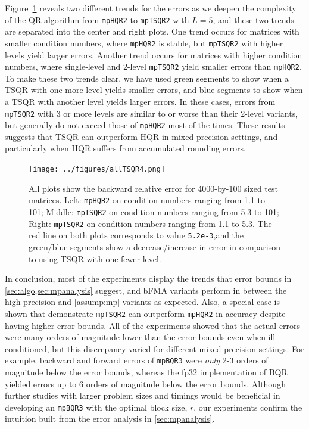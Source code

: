 \documentclass[review,onefignum,onetabnum]{siamart190516}
\begin{document}
Figure~\ref{fig:allTSQR} reveals two different trends for the errors as we deepen the complexity of the QR algorithm from {\tt mpHQR2} to {\tt mpTSQR2} with $L=5$, and these two trends are separated into the center and right plots. 
One trend occurs for matrices with smaller condition numbers, where {\tt mpHQR2} is stable, but {\tt mpTSQR2} with higher levels yield larger errors. 
Another trend occurs for matrices with higher condition numbers, where single-level and 2-level {\tt mpTSQR2} yield smaller errors than {\tt mpHQR2}. 
To make these two trends clear, we have used green segments to show when a TSQR with one more level yields smaller errors, and blue segments to show when a TSQR with another level yields larger errors.
In these cases, errors from {\tt mpTSQR2} with 3 or more levels are similar to or worse than their 2-level variants, but generally do not exceed those of {\tt mpHQR2} most of the times.
These results suggests that TSQR can outperform HQR in mixed precision settings, and particularly when HQR suffers from accumulated rounding errors.
\begin{figure}[h!]%
	\centering
	\texttt{[image: ../figures/allTSQR4.png]}
	\vspace{-15pt}
	\caption{\label{fig:allTSQR} All plots show the backward relative error for 4000-by-100 sized test matrices. Left: {\tt mpHQR2} on condition numbers ranging from 1.1 to 101;  Middle: {\tt mpTSQR2} on condition numbers ranging from 5.3 to 101; Right:  {\tt mpTSQR2} on condition numbers ranging from 1.1 to 5.3.  The red line on both plots corresponds to value {\tt 5.2e-3},and the green/blue segments show a decrease/increase in error in comparison to using TSQR with one fewer level. }
	\vspace{-5pt}
\end{figure}

In conclusion, most of the experiments display the trends that error bounds in \cref{sec:algo,sec:mpanalysis} suggest, and bFMA variants perform in between the high precision and \cref{assump:mp} variants as expected.
Also, a special case is shown that demonstrate {\tt mpTSQR2} can outperform {\tt mpHQR2} in accuracy despite having higher error bounds.
All of the experiments showed that the actual errors were many orders of magnitude lower than the error bounds even when ill-conditioned, but this discrepancy varied for different mixed precision settings.
For example, backward and forward errors of {\tt mpBQR3} were \emph{only} 2-3 orders of magnitude below the error bounds, whereas the fp32 implementation of BQR yielded errors up to 6 orders of magnitude below the error bounds.
Although further studies with larger problem sizes and timings would be beneficial in developing an {\tt mpBQR3} with the optimal block size, $r$, our experiments confirm the intuition built from the error analysis in \cref{sec:mpanalysis}.
\end{document}
